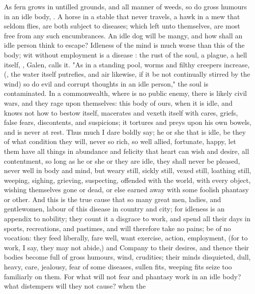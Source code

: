 As fern grows in untilled grounds, and all manner of weeds, so do gross humours
in an idle body, . A horse in a stable that
never travels, a hawk in a mew that seldom flies, are both subject to diseases;
which left unto themselves, are most free from any such encumbrances. An idle
dog will be mangy, and how shall an idle person think to escape? Idleness of
the mind is much worse than this of the body; wit without employment is a
disease : the rust of the
soul, a plague, a hell itself, , Galen, calls it. "As in a standing pool,
worms and filthy creepers increase, (,
the water itself putrefies, and air likewise, if it be not continually stirred
by the wind) so do evil and corrupt thoughts in an idle person," the soul is
contaminated. In a commonwealth, where is no public enemy, there is likely
civil wars, and they rage upon themselves: this body of ours, when it is idle,
and knows not how to bestow itself, macerates and vexeth itself with cares,
griefs, false fears, discontents, and suspicions; it tortures and preys upon
his own bowels, and is never at rest. Thus much I dare boldly say; he or she
that is idle, be they of what condition they will, never so rich, so well
allied, fortunate, happy, let them have all things in abundance and felicity
that heart can wish and desire, all contentment, so long as he or she or they
are idle, they shall never be pleased, never well in body and mind, but weary
still, sickly still, vexed still, loathing still, weeping, sighing, grieving,
suspecting, offended with the world, with every object, wishing themselves gone
or dead, or else earned away with some foolish phantasy or other. And this is
the true cause that so many great men, ladies, and gentlewomen, labour of this
disease in country and city; for idleness is an appendix to nobility; they
count it a disgrace to work, and spend all their days in sports, recreations,
and pastimes, and will therefore take no pains; be of no vocation: they feed
liberally, fare well, want exercise, action, employment, (for to work, I say,
they may not abide,) and Company to their desires, and thence their bodies
become full of gross humours, wind, crudities; their minds disquieted, dull,
heavy, \etc{} care, jealousy, fear of some diseases, sullen fits, weeping fits
seize too familiarly on them. For what will not fear and
phantasy work in an idle body? what distempers will they not cause? when the
